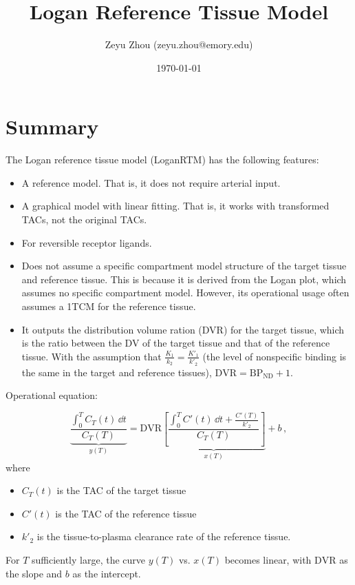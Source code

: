 \documentclass[11pt]{article}
\begin{document}
	
	

	
\title{Logan Reference Tissue Model}
\author{Zeyu Zhou (zeyu.zhou@emory.edu)} 
\date{\today}
\maketitle



\section{Summary}


The Logan reference tissue model (LoganRTM) \cite{logan1996distribution} has the following features:
\begin{itemize}
	\item A reference model. That is, it does not require arterial input. 
	\item A graphical model with linear fitting. That is, it works with transformed TACs, not the original TACs. 
	\item For reversible receptor ligands. 
	\item Does not assume a specific compartment model structure of the target tissue and reference tissue. This is because it is derived from the Logan plot, which assumes no specific compartment model. However, its operational usage often assumes a 1TCM for the reference tissue. 
	\item It outputs the distribution volume ration (DVR) for the target tissue, which is the ratio between the DV of the target tissue and that of the reference tissue. With the assumption that $\frac{K_1}{k_2} = \frac{K'_1}{k'_2}$ (the level of nonspecific binding is the same in the target and reference tissues), $\text{DVR} = \text{BP}_{\text{ND}} + 1$.
\end{itemize}

Operational equation:

\begin{equation}
	\label{eq:operational_eq}
	\underbrace{\frac{\int_0^T \! C_T(t) \, \dd  t}{C_T(T)}}_{y(T)} = \text{DVR} \underbrace{\left[\frac{\int_0^T \! C'(t) \, \dd t + \frac{C'(T)}{k'_2}}{C_T(T)}  \right]}_{x(T)} + b \, , 
\end{equation}
where 
\begin{itemize}
	\item $C_T(t)$ is the TAC of the target tissue
	\item $C'(t)$ is the TAC of the reference tissue 
	\item $k'_2$ is the tissue-to-plasma clearance rate of the reference tissue.
\end{itemize}
For $T$ sufficiently large, the curve $y(T)$ vs. $x(T)$ becomes linear, with $\text{DVR}$ as the slope and $b$ as the intercept. 
\end{document}

